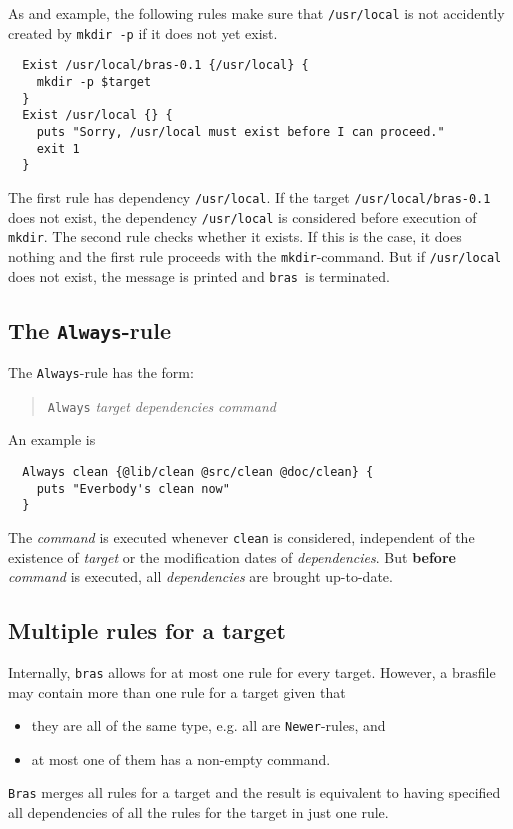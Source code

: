 \documentclass[12pt]{article}
\newcommand{\bras}{\texttt{bras}}
\newcommand{\Bras}{\texttt{Bras}}
\begin{document}
As and example, the following rules make sure that
\texttt{/usr/local} is not accidently created by \texttt{mkdir -p} if
it does not yet exist.

\begin{verbatim}
  Exist /usr/local/bras-0.1 {/usr/local} {
    mkdir -p $target
  }
  Exist /usr/local {} {
    puts "Sorry, /usr/local must exist before I can proceed."
    exit 1
  }	
\end{verbatim}
The first rule has dependency \texttt{/usr/local}. If the target
\texttt{/usr/local/bras-0.1}
does not exist, the dependency \texttt{/usr/local} is considered
before execution of \texttt{mkdir}. The second rule checks whether it
exists. If this is the case, it does nothing and the first rule
proceeds with the \texttt{mkdir}-command. But if
\texttt{/usr/local} does not exist, the message is printed and \bras\
is terminated.

\subsection{The \texttt{Always}-rule}

The \texttt{Always}-rule has the form:

\begin{quote}
  \texttt{Always} \textit{target} \textit{dependencies} \textit{command}
\end{quote}

An example is
\begin{verbatim}
  Always clean {@lib/clean @src/clean @doc/clean} {
    puts "Everbody's clean now"
  }
\end{verbatim}

The \textit{command} is executed whenever \texttt{clean} is
considered, independent of the existence of \textit{target} or the
modification dates of \textit{dependencies}.  But \textbf{before}
\textit{command} is executed, all
\textit{dependencies} are brought up-to-date.

\subsection{Multiple rules for a target}
Internally, \bras{} allows for at most one rule for every
target. However, a brasfile may contain more than one rule for a
target given that
\begin{itemize}
\item they are all of the same type, e.g. all are \texttt{Newer}-rules,
and 
\item at most one of them has a non-empty command.
\end{itemize}
\Bras{} merges all rules for a target and the result is
equivalent to having specified all dependencies of all the rules for
the target in just one rule.
\end{document}
